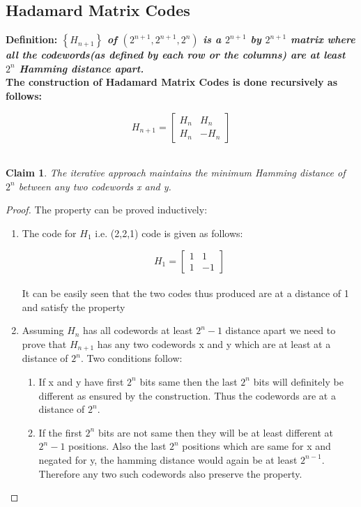 \documentclass[11pt]{article}
\newtheorem{claim}[theorem]{Claim}
\begin{document}
    \subsection{Hadamard Matrix Codes}
        \bf Definition: \normalfont \textit{$\left\{ H_{n+1} \right\}$ of $(2^{n+1},2^{n+1},2^n)$ is a $2^{n+1}$ by $2^{n+1}$ matrix where all the codewords(as defined by each row or the columns) are at least $2^n$ Hamming distance apart.}\normalfont\\
        The construction of Hadamard Matrix Codes is done recursively as follows:
        
        \[
                H_{n+1} = \left[{ \begin{array}{cc}
                         H_n & H_n\\
                         H_n & -H_n      \end{array} } \right]
            \]\\
            \begin{claim}
                The iterative approach maintains the minimum Hamming distance of $2^n$ between any two codewords x and y.
            \end{claim}
            \begin{proof}
                The property can be proved inductively:
                \begin{enumerate}
                \item The code for $H_1$ i.e. (2,2,1) code is given as follows:
                
                    \[
                        H_1=
                            \left[ {\begin{array}{cc}
                            1 & 1 \\       1 & -1       \end{array} } \right]
                    \]\\
                    It can be easily seen that the two codes thus produced are at a distance of 1 and satisfy the property
                \item Assuming $H_n$ has all codewords at least $2^n-1$ distance apart we need to prove that $H_{n+1}$ has any two codewords x and y which are at least at a distance of $2^n$. Two conditions follow:
                    \begin{enumerate}
                        \item If x and y have first $2^n$ bits same then the last $2^n$ bits will definitely be different as ensured by the construction. Thus the codewords are at a distance of $2^n$.
                        \item If the first $2^n$ bits are not same then they will be at least different at $2^n-1$ positions. Also the last $2^n$ positions which are same for x and negated for y, the hamming distance would again be at least $2^{n-1}$. Therefore any two such codewords also preserve the property. 
                    \end{enumerate}
            \end{enumerate}
            \end{proof}
\end{document}
